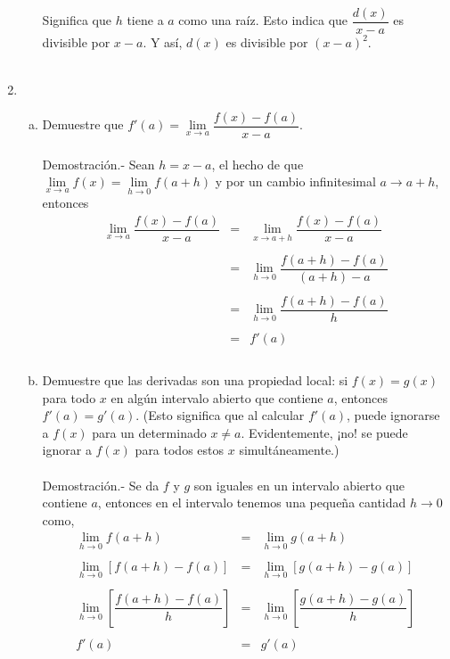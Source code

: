 \begin{enumerate}[\bfseries 1]
\begin{enumerate}[(a)]
		    Significa que $h$ tiene a $a$ como una raíz. Esto indica que $\dfrac{d(x)}{x-a}$ es divisible por $x-a$. Y así, $d(x)$ es divisible por $(x-a)^2$.\\\\

	\end{enumerate}

    \item 
	\begin{enumerate}[(a)]

	    \item Demuestre que $f'(a)=\lim\limits_{x\to a} \dfrac{f(x)-f(a)}{x-a}$.\\\\
		Demostración.-\; Sean $h=x-a$,  el hecho de que $\lim\limits_{x\to a}f(x)=\lim\limits_{h\to 0}f(a+h)$ y por un cambio infinitesimal $a\to a+h$, entonces 
		$$\begin{array}{rcl}
		     \lim\limits_{x\to a}\dfrac{f(x)-f(a)}{x-a}&=& \lim\limits_{x\to a+h}\dfrac{f(x)-f(a)}{x-a}\\\\
							       &=& \lim\limits_{h\to 0} \dfrac{f(a+h)-f(a)}{(a+h)-a}\\\\
							       &=& \lim\limits_{h\to 0}\dfrac{f(a+h)-f(a)}{h}\\\\
					&=& f'(a)\\\\
		\end{array}$$
		\vspace{.5cm}

	    \item Demuestre que las derivadas son una propiedad local: si $f(x)=g(x)$ para todo $x$ en algún intervalo abierto que contiene $a$, entonces $f'(a)=g'(a)$. (Esto significa que al calcular $f'(a)$, puede ignorarse a $f(x)$ para un determinado $x\neq a$. Evidentemente, ¡no! se puede ignorar a $f(x)$ para todos estos $x$ simultáneamente.)\\\\
		Demostración.-\; Se da $f$ y $g$ son iguales en un intervalo abierto que contiene $a$, entonces en el intervalo tenemos una pequeña cantidad $h\to 0$ como,
		$$\begin{array}{rcl}
		    \lim\limits_{h\to 0} f(a+h) &=& \lim\limits_{h\to 0} g(a+h)\\\\
		    \lim\limits_{h\to 0} \left[f(a+h)-f(a)\right] &=& \lim\limits_{h\to 0} \left[g(a+h)-g(a)\right]\\\\
		    \lim\limits_{h\to 0} \left[\dfrac{f(a+h)-f(a)}{h}\right] &=& \lim\limits_{h\to 0} \left[\dfrac{g(a+h)-g(a)}{h}\right]\\\\
									     f'(a)&=&g'(a)\\\\
		\end{array}$$


\end{enumerate}
\end{enumerate}
